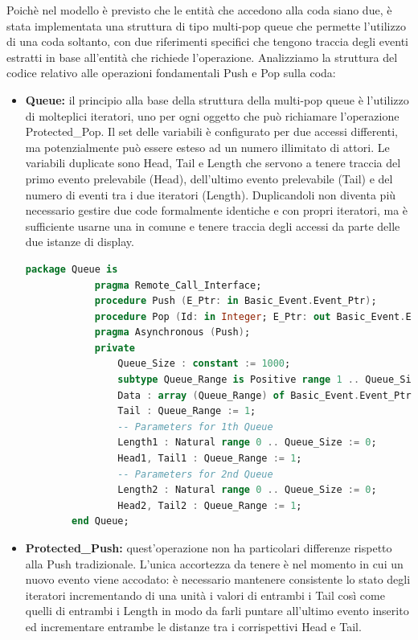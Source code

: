 \documentclass[aps,letterpaper,10pt]{article}
\begin{document}
Poich\`e nel modello \`e previsto che le entit\`a che accedono alla coda siano due, \`e stata implementata una struttura di tipo multi-pop queue che permette l'utilizzo di una coda soltanto, con due riferimenti specifici che tengono traccia degli eventi estratti in base all'entit\`a che richiede l'operazione. Analizziamo la struttura del codice relativo alle operazioni fondamentali Push e Pop sulla coda:

\begin{itemize}
	\item \textbf{Queue:} il principio alla base della struttura della multi-pop queue \`e l'utilizzo di molteplici iteratori, uno per ogni oggetto che pu\`o richiamare l'operazione Protected\_Pop. Il set delle variabili \`e configurato per due accessi differenti, ma potenzialmente pu\`o essere esteso ad un numero illimitato di attori. Le variabili duplicate sono Head, Tail e Length che servono a tenere traccia del primo evento prelevabile (Head), dell'ultimo evento prelevabile (Tail) e del numero di eventi tra i due iteratori (Length). Duplicandoli non diventa pi\`u necessario gestire due code formalmente identiche e con propri iteratori, ma \`e sufficiente usarne una in comune e tenere traccia degli accessi da parte delle due istanze di display.
	
		\begin{lstlisting}[language=Ada]
		package Queue is
			pragma Remote_Call_Interface;
			procedure Push (E_Ptr: in Basic_Event.Event_Ptr);
		    procedure Pop (Id: in Integer; E_Ptr: out Basic_Event.Event_Ptr);
			pragma Asynchronous (Push);
			private
			    Queue_Size : constant := 1000;
			    subtype Queue_Range is Positive range 1 .. Queue_Size;
			    Data : array (Queue_Range) of Basic_Event.Event_Ptr;
				Tail : Queue_Range := 1;
				-- Parameters for 1th Queue
			    Length1 : Natural range 0 .. Queue_Size := 0;
			    Head1, Tail1 : Queue_Range := 1;
				-- Parameters for 2nd Queue
			    Length2 : Natural range 0 .. Queue_Size := 0;
			    Head2, Tail2 : Queue_Range := 1;
		end Queue;
		\end{lstlisting}	
	
	\item \textbf{Protected\_Push:} quest'operazione non ha particolari differenze rispetto alla Push tradizionale. L'unica accortezza da tenere \`e nel momento in cui un nuovo evento viene accodato: \`e necessario mantenere consistente lo stato degli iteratori incrementando di una unit\`a i valori di entrambi i Tail cos\`i come quelli di entrambi i Length in modo da farli puntare all'ultimo evento inserito ed incrementare entrambe le distanze tra i corrispettivi Head e Tail.
	

\end{itemize}
\end{document}
